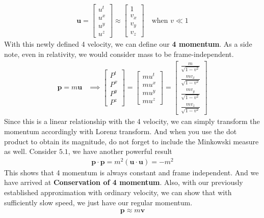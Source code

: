 \documentclass[11pt,letterpaper]{book}
\begin{document}
\begin{align}
\mathbf{u} = 
\begin{bmatrix}
u^t \\
u^x \\
u^y \\
u^z
\end{bmatrix}
\approx
\begin{bmatrix}
1 \\
v_x \\
v_y \\
v_z
\end{bmatrix}
\quad \text{when } v \ll 1
\end{align}
With this newly defined 4 velocity, we can define our \textbf{4 momentum}. As a side note, even in relativity, we would consider mass to be frame-independent. 
\begin{align}
\mathbf{p} = m\mathbf{u} &\implies 
\begin{bmatrix}
P^t \\
P^x \\
P^y \\
P^z
\end{bmatrix}
=
\begin{bmatrix}
mu^t \\
mu^x \\
mu^y \\
mu^z
\end{bmatrix}
=
\begin{bmatrix}
\frac{m}{\sqrt{1 - v^2}} \\
\frac{mv_x}{\sqrt{1 - v^2}} \\
\frac{mv_y}{\sqrt{1 - v^2}} \\
\frac{mv_z}{\sqrt{1 - v^2}}
\end{bmatrix}
\end{align}
Since this is a linear relationship with the 4 velocity, we can simply transform the momentum accordingly with Lorenz transform. And when you use the dot product to obtain its magnitude, do not forget to include the Minkowski measure as well. Consider $5.1$, we have another powerful result
\begin{align}
\mathbf{p}\cdot\mathbf{p} = m^2(\mathbf{u}\cdot \mathbf{u}) = -m^2
\end{align}
This shows that 4 momentum is always constant and frame independent. And we have arrived at \textbf{Conservation of 4 momentum}. Also, with our previously established approximation with ordinary velocity, we can show that with sufficiently slow speed, we just have our regular momentum.
\begin{align}
\mathbf{p} \approx m\mathbf{v}
\end{align}
\end{document}
